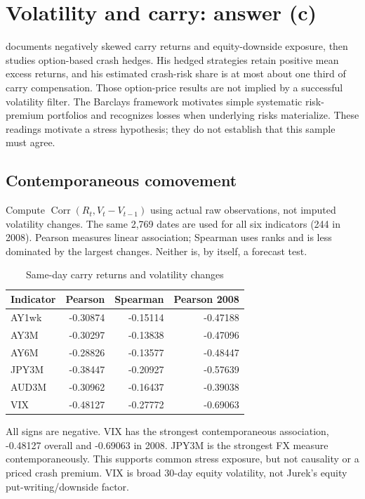 \documentclass[10pt,letterpaper]{article}
\newcommand{\rVixCorr}{-0.48127}
\newcommand{\rVixCrisis}{-0.69063}
\begin{document}
\section{Volatility and carry: answer (c)}
\citet{jurek2014} documents negatively skewed carry returns and equity-downside exposure,
then studies option-based crash hedges. His hedged strategies retain positive mean excess
returns, and his estimated crash-risk share is at most about one third of carry compensation.
Those option-price results are not implied by a successful volatility filter. The Barclays framework \citep{barclays2011} motivates
simple systematic risk-premium portfolios and recognizes losses when underlying risks materialize.
These readings motivate a stress hypothesis; they do not establish that this sample must agree.

\subsection{Contemporaneous comovement}
Compute $\operatorname{Corr}(R_t,V_t-V_{t-1})$ using actual raw observations, not imputed
volatility changes. The same 2,769 dates are used for all six indicators (244 in 2008).
Pearson measures linear association; Spearman uses ranks and is less dominated by the largest
changes. Neither is, by itself, a forecast test.
\begin{table}[H]\centering\small\caption{Same-day carry returns and volatility changes}
\begin{tabular}{lrrr}\toprule
Indicator & Pearson & Spearman & Pearson 2008\\\midrule
AY1wk & -0.30874 & -0.15114 & -0.47188\\
AY3M & -0.30297 & -0.13838 & -0.47096\\
AY6M & -0.28826 & -0.13577 & -0.48447\\
JPY3M & -0.38447 & -0.20927 & -0.57639\\
AUD3M & -0.30962 & -0.16437 & -0.39038\\
VIX & -0.48127 & -0.27772 & -0.69063\\
\bottomrule\end{tabular}\end{table}

All signs are negative. VIX has the strongest contemporaneous association, \rVixCorr{} overall
and \rVixCrisis{} in 2008. JPY3M is the strongest FX measure contemporaneously. This supports
common stress exposure, but not causality or a priced crash premium. VIX is broad 30-day equity
volatility, not Jurek's equity put-writing/downside factor.
\end{document}
